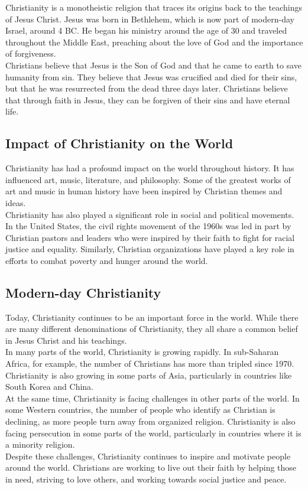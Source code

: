 \documentclass[11pt]{article}
\begin{document}
Christianity is a monotheistic religion that traces its origins back to the teachings of Jesus Christ. Jesus was born in Bethlehem, which is now part of modern-day Israel, around 4 BC. He began his ministry around the age of 30 and traveled throughout the Middle East, preaching about the love of God and the importance of forgiveness.\\

Christians believe that Jesus is the Son of God and that he came to earth to save humanity from sin. They believe that Jesus was crucified and died for their sins, but that he was resurrected from the dead three days later. Christians believe that through faith in Jesus, they can be forgiven of their sins and have eternal life.

\subsection{Impact of Christianity on the World}

Christianity has had a profound impact on the world throughout history. It has influenced art, music, literature, and philosophy. Some of the greatest works of art and music in human history have been inspired by Christian themes and ideas.\\

Christianity has also played a significant role in social and political movements. In the United States, the civil rights movement of the 1960s was led in part by Christian pastors and leaders who were inspired by their faith to fight for racial justice and equality. Similarly, Christian organizations have played a key role in efforts to combat poverty and hunger around the world.

\subsection{Modern-day Christianity}

Today, Christianity continues to be an important force in the world. While there are many different denominations of Christianity, they all share a common belief in Jesus Christ and his teachings.\\

In many parts of the world, Christianity is growing rapidly. In sub-Saharan Africa, for example, the number of Christians has more than tripled since 1970. Christianity is also growing in some parts of Asia, particularly in countries like South Korea and China.\\

At the same time, Christianity is facing challenges in other parts of the world. In some Western countries, the number of people who identify as Christian is declining, as more people turn away from organized religion. Christianity is also facing persecution in some parts of the world, particularly in countries where it is a minority religion.\\

Despite these challenges, Christianity continues to inspire and motivate people around the world. Christians are working to live out their faith by helping those in need, striving to love others, and working towards social justice and peace.
\end{document}

